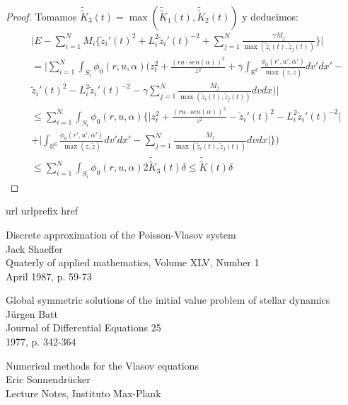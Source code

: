 \documentclass[a4paper,10pt]{scrartcl}
\theoremstyle{definition}
\newcommand{\dtilde}[1]{\widetilde{\widetilde{#1}}}
\numberwithin{equation}{section}
\begin{document}
\begin{proof}
Tomamos $\dtilde{K}_3(t) = \max(\dtilde{K}_1(t), \dtilde{K}_2(t))$ y deducimos:
\begin{align*}
&\Bigg|E - \sum_{i=1}^N M_i\bigg\{\widetilde{z}_i'(t)^2 + L_i^2\widetilde{z}_i'(t)^{-2} + \sum_{j=1}^N \frac{\gamma M_j}{\max(\widetilde{z}_i(t), \widetilde{z}_j(t))}\bigg\} \Bigg| \\
&= \Bigg|\sum_{i=1}^N \int_{S_i} \phi_0(r,u,\alpha) \Bigg(z_t^2 + \frac{(ru\cdot sen(\alpha))^2}{z^2} + \gamma \int_{\mathbb{R}^6} \frac{\phi_0(r',u',\alpha')}{\max(z,\widetilde{z})} dv' dx' - \\
&\widetilde{z}_i'(t)^2 - L_i^2\widetilde{z}_i'(t)^{-2} - \gamma \sum_{j=1}^N \frac{M_j}{\max(\widetilde{z}_i(t), \widetilde{z}_j(t))} dv dx \Bigg)\Bigg| \\
&\le \sum_{i=1}^N \int_{S_i} \phi_0(r,u,\alpha) \Bigg\{\Bigg| z_t^2 + \frac{(ru\cdot sen(\alpha))^2}{z^2} -
\widetilde{z}_i'(t)^2 - L_i^2\widetilde{z}_i'(t)^{-2} \Bigg| \\
&+ \Bigg|\int_{\mathbb{R}^6} \frac{\phi_0(r',u',\alpha')}{\max(z,\widetilde{z})} dv' dx' - \sum_{j=1}^N \frac{M_j}{\max(\widetilde{z}_i(t), \widetilde{z}_j(t))} dv dx \Bigg|\Bigg\}\Bigg) \\
&\le \sum_{i=1}^N \int_{S_i} \phi_0(r,u,\alpha) 2\dtilde{K}_3(t)\delta \le \dtilde{K}(t) \delta
\end{align*}


 \end{proof}


\newpage
\begin{thebibliography}{10}
    \expandafter\ifx\csname url\endcsname\relax
    \def\url#1{\texttt{#1}}\fi
    \expandafter\ifx\csname urlprefix\endcsname\relax\def\urlprefix{URL }\fi
    \expandafter\ifx\csname href\endcsname\relax
    \def\href#1#2{#2} \def\path#1{#1}\fi
    
    Discrete approximation of the Poisson-Vlasov system\\
    Jack Shaeffer\\
    Quaterly of applied mathematics, Volume XLV, Number 1\\
    April 1987, p. 59-73
    
    Global symmetric solutions of the initial value problem of stellar dynamics\\
    Jürgen Batt\\
    Journal of Differential Equations 25\\
    1977, p. 342-364 
    
    Numerical methods for the Vlasov equations\\
    Eric Sonnendrücker\\
    Lecture Notes, Instituto Max-Plank
\end{thebibliography}
	
\end{document}
